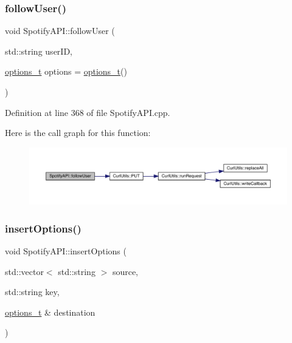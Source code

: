 \subsubsection{\texorpdfstring{follow\+User()}{followUser()}}
{\footnotesize\ttfamily void Spotify\+A\+P\+I\+::follow\+User (\begin{DoxyParamCaption}\item[{std\+::string}]{user\+ID,  }\item[{\mbox{\hyperlink{_spotify_a_p_i_8h_a0ff5cac1a4007bb330b7d9939650c283}{options\+\_\+t}}}]{options = {\ttfamily \mbox{\hyperlink{_spotify_a_p_i_8h_a0ff5cac1a4007bb330b7d9939650c283}{options\+\_\+t}}()} }\end{DoxyParamCaption})}



Definition at line 368 of file Spotify\+A\+P\+I.\+cpp.

Here is the call graph for this function\+:
\nopagebreak
\begin{figure}[H]
\begin{center}
\leavevmode
\includegraphics[width=350pt]{class_spotify_a_p_i_a9b47427d58da9c870860bf066430cb35_cgraph}
\end{center}
\end{figure}
\mbox{\label{class_spotify_a_p_i_ac6e0064f7fb02813ab423f4c9f5d042e}} 
\subsubsection{\texorpdfstring{insert\+Options()}{insertOptions()}}
{\footnotesize\ttfamily void Spotify\+A\+P\+I\+::insert\+Options (\begin{DoxyParamCaption}\item[{std\+::vector$<$ std\+::string $>$}]{source,  }\item[{std\+::string}]{key,  }\item[{\mbox{\hyperlink{_spotify_a_p_i_8h_a0ff5cac1a4007bb330b7d9939650c283}{options\+\_\+t}} \&}]{destination }\end{DoxyParamCaption})\hspace{0.3cm}{\ttfamily [private]}}



